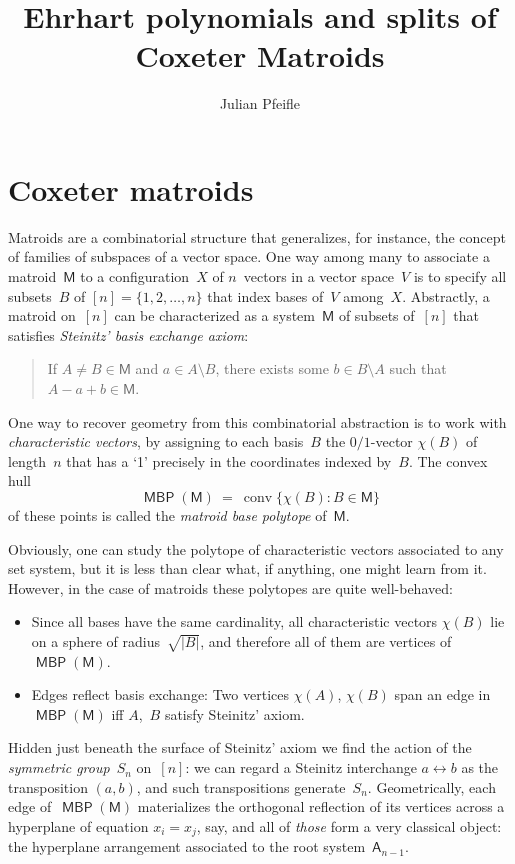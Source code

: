 \documentclass[11pt]{amsart}
\title{Ehrhart polynomials and splits of Coxeter Matroids}
\author{Julian Pfeifle}
\newcommand{\MM}{\mathsf{M}}
\DeclareMathOperator\conv{conv}
\DeclareMathOperator{\MBP}{\mathsf{MBP}}
\theoremstyle{definition}
\begin{document}
\maketitle

\section{Coxeter matroids}

Matroids are a combinatorial structure that generalizes, for instance,
the concept of families of subspaces of a vector space. One way among
many to associate a matroid~$\MM$ to a configuration~$X$ of
$n$~vectors in a vector space~$V$ is to specify all subsets~$B$ of
$[n]=\{1,2,\dots,n\}$ that index bases of~$V$ among~$X$. Abstractly, a
matroid on~$[n]$ can be characterized as a system~$\MM$ of subsets
of~$[n]$ that satisfies \emph{Steinitz' basis exchange axiom}:

\begin{quote}
  If $A\ne B\in\MM$ and $a\in A\setminus B$, there exists some $b\in B\setminus A$ such that $A-a+b\in\MM$.
\end{quote}

One way to recover geometry from this combinatorial abstraction is to
work with \emph{characteristic vectors}, by assigning to each
basis~$B$ the $0/1$-vector $\chi(B)$ of length~$n$ that has a `1'
precisely in the coordinates indexed by~$B$. The convex hull
\[
  \MBP(\MM) \ = \ \conv\{\chi(B):B\in\MM\}
\]
of these points is called the \emph{matroid base polytope} of~$\MM$.

\medskip Obviously, one can study the polytope of characteristic
vectors associated to any set system, but it is less than clear what,
if anything, one might learn from it. However, in the case of matroids
these polytopes are quite well-behaved:

\begin{itemize}
\item Since all bases have the same cardinality, all characteristic
  vectors $\chi(B)$ lie on a sphere of radius~$\sqrt{|B|}$, and
  therefore all of them are vertices of~$\MBP(\MM)$.

\item Edges reflect basis exchange: Two vertices $\chi(A)$, $\chi(B)$
  span an edge in~$\MBP(\MM)$ iff $A$,~$B$ satisfy Steinitz' axiom.
\end{itemize}

Hidden just beneath the surface of Steinitz' axiom we find the action
of the \emph{symmetric group}~$S_n$ on~$[n]$: we can regard a Steinitz
interchange $a\leftrightarrow b$ as the transposition $(a,b)$, and
such transpositions generate~$S_n$. Geometrically, each edge
of~$\MBP(\MM)$ materializes the orthogonal reflection of its vertices
across a hyperplane of equation $x_i=x_j$, say, and all of
\emph{those} form a very classical object: the hyperplane arrangement
associated to the root system~$\mathsf{A}_{n-1}$.
\end{document}
